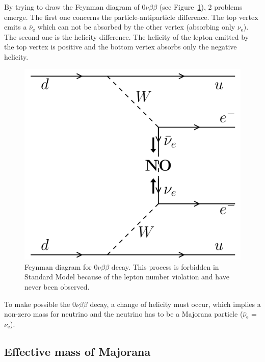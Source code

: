 \documentclass[main.tex]{subfiles}
\begin{document}
\bigskip


\NI By trying to draw the Feynman diagram of 0$\nu\beta\beta$ (see Figure~\ref{0nubbFeynman}), 2 problems emerge. The first one concerns the particle-antiparticle difference. The top vertex emits a $\bar{\nu}_{\text{e}}$ which can not be absorbed by the other vertex (absorbing only $\nu_{\text{e}}$). The second one is the helicity difference. The helicity of the lepton emitted by the top vertex is positive and the bottom vertex absorbs only the negative helicity. 


\begin{figure}[h!]
\begin{center}
\includegraphics[scale=0.25]{pictures/Chap2/0nubb_Feynman.png}
\caption{Feynman diagram for 0$\nu\beta\beta$ decay. This process is forbidden in Standard Model because of the lepton number violation and have never been observed.}
\label{0nubbFeynman}
\end{center}
\end{figure}


\NI To make possible the 0$\nu\beta\beta$ decay, a change of helicity must occur, which implies a non-zero mass for neutrino and the neutrino has to be a Majorana particle ($\bar{\nu}_{\text{e}}$ = $\nu_{\text{e}}$).


\subsection{Effective mass of Majorana}
\end{document}
